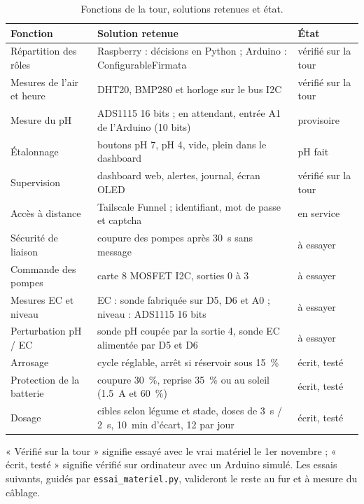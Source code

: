 \begin{table}[H]
\centering
\small
\begin{tabularx}{\textwidth}{|l|Y|l|}
\hline
\textbf{Fonction} & \textbf{Solution retenue} & \textbf{État} \\
\hline
Répartition des rôles & Raspberry : décisions en Python ; Arduino : ConfigurableFirmata & vérifié sur la tour \\
\hline
Mesures de l'air et heure & DHT20, BMP280 et horloge sur le bus I2C & vérifié sur la tour \\
\hline
Mesure du pH & ADS1115 16 bits ; en attendant, entrée A1 de l'Arduino (10 bits) & provisoire \\
\hline
Étalonnage & boutons pH 7, pH 4, vide, plein dans le dashboard & pH fait \\
\hline
Supervision & dashboard web, alertes, journal, écran OLED & vérifié sur la tour \\
\hline
Accès à distance & Tailscale Funnel ; identifiant, mot de passe et captcha & en service \\
\hline
Sécurité de liaison & coupure des pompes après \qty{30}{s} sans message & à essayer \\
\hline
Commande des pompes & carte 8 MOSFET I2C, sorties 0 à 3 & à essayer \\
\hline
Mesures EC et niveau & EC : sonde fabriquée sur D5, D6 et A0 ; niveau : ADS1115 16 bits & à essayer \\
\hline
Perturbation pH / EC & sonde pH coupée par la sortie 4, sonde EC alimentée par D5 et D6 & à essayer \\
\hline
Arrosage & cycle réglable, arrêt si réservoir sous \qty{15}{\percent} & écrit, testé \\
\hline
Protection de la batterie & coupure \qty{30}{\percent}, reprise \qty{35}{\percent} ou au soleil (\qty{1,5}{A} et \qty{60}{\percent}) & écrit, testé \\
\hline
Dosage & cibles selon légume et stade, doses de \qty{3}{s} / \qty{2}{s}, \qty{10}{min} d'écart, 12 par jour & écrit, testé \\
\hline
\end{tabularx}
\caption{Fonctions de la tour, solutions retenues et état.}
\end{table}

« Vérifié sur la tour » signifie essayé avec le vrai matériel le 1er novembre ; « écrit, testé » signifie vérifié sur ordinateur avec un Arduino simulé. Les essais suivants, guidés par \texttt{essai\_materiel.py}, valideront le reste au fur et à mesure du câblage.

